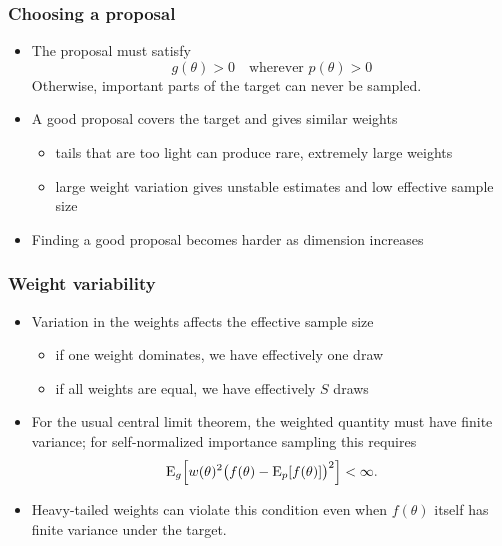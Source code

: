 \documentclass[10pt]{beamer}
\begin{document}
\begin{frame}

\frametitle{Choosing a proposal}

  \begin{itemize}
  \item The proposal must satisfy
    \[
      g(\theta)>0 \quad \text{wherever } p(\theta)>0
    \]
    Otherwise, important parts of the target can never be sampled.
    \pause
  \item A good proposal covers the target and gives similar weights
    \begin{itemize}
      \item tails that are too light can produce rare, extremely large weights
      \item large weight variation gives unstable estimates and low effective
        sample size
    \end{itemize}
    \pause
  \item Finding a good proposal becomes harder as dimension increases
  \end{itemize}

\end{frame}

\begin{frame}

\frametitle{Weight variability}

  \begin{itemize}
  \item Variation in the weights affects the {\color{uured} effective sample size}
    \begin{itemize}
    \item if one weight dominates, we have effectively one draw
    \item if all weights are equal, we have effectively $S$ draws
    \end{itemize}
    \pause
  \item For the usual central limit theorem, the weighted quantity must
    have finite variance; for self-normalized importance sampling this
    requires
    \[
      \mathrm{E}_g\!\left[w(\theta)^2
      \bigl(f(\theta)-\mathrm{E}_p[f(\theta)]\bigr)^2\right]<\infty.
    \]
  \item<3-> Heavy-tailed weights can violate this condition even when
    $f(\theta)$ itself has finite variance under the target.
  \end{itemize}

\end{frame}
\end{document}
